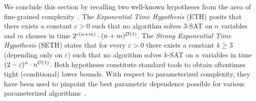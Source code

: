 We conclude this section by recalling two well-known hypotheses from the area of
fine-grained complexity~\cite{jcss/ImpagliazzoP01,jcss/ImpagliazzoPZ01}.
The \emph{Exponential Time Hypothesis} (ETH) posits that there exists a
constant $c>0$ such that no algorithm solves 3-SAT on $n$ variables and $m$
clauses in time $2^{c (n+m)} \cdot (n + m)^{\mathcal{O}(1)}$.
The \emph{Strong Exponential Time Hypothesis} (SETH) states that for every
$\varepsilon>0$ there exists a constant $k \ge 3$ (depending only on $\varepsilon$)
such that no algorithm solves $k$-SAT on
$n$ variables in time $(2 - \varepsilon)^{n} \cdot n^{\mathcal{O}(1)}$.
Both hypotheses constitute standard tools to obtain oftentimes tight (conditional) lower bounds.
With respect to parameterized complexity, they have been used to pinpoint the best parametric dependence possible for various parameterized algorithms~\cite{talg/LokshtanovMS18,siamcomp/LokshtanovMS18}.
